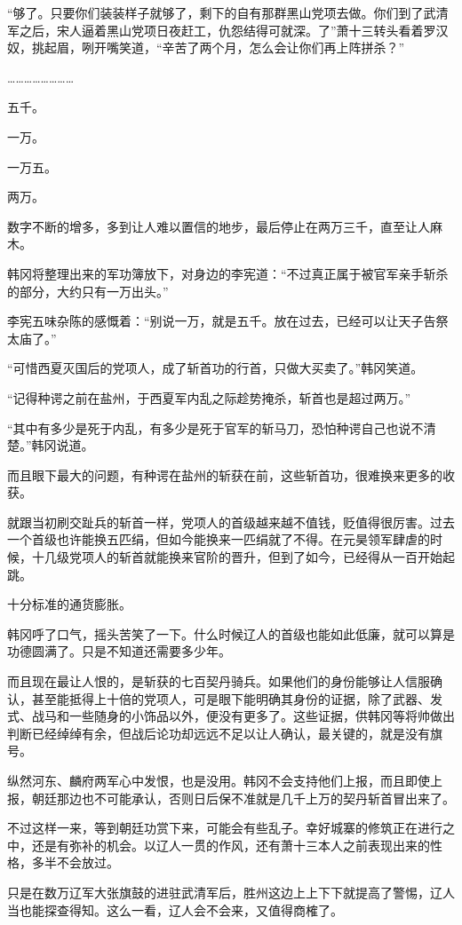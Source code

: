 “够了。只要你们装装样子就够了，剩下的自有那群黑山党项去做。你们到了武清军之后，宋人逼着黑山党项日夜赶工，仇怨结得可就深。了”萧十三转头看着罗汉奴，挑起眉，咧开嘴笑道，“辛苦了两个月，怎么会让你们再上阵拼杀？”

……………………

五千。

一万。

一万五。

两万。

数字不断的增多，多到让人难以置信的地步，最后停止在两万三千，直至让人麻木。

韩冈将整理出来的军功簿放下，对身边的李宪道：“不过真正属于被官军亲手斩杀的部分，大约只有一万出头。”

李宪五味杂陈的感慨着：“别说一万，就是五千。放在过去，已经可以让天子告祭太庙了。”

“可惜西夏灭国后的党项人，成了斩首功的行首，只做大买卖了。”韩冈笑道。

“记得种谔之前在盐州，于西夏军内乱之际趁势掩杀，斩首也是超过两万。”

“其中有多少是死于内乱，有多少是死于官军的斩马刀，恐怕种谔自己也说不清楚。”韩冈说道。

而且眼下最大的问题，有种谔在盐州的斩获在前，这些斩首功，很难换来更多的收获。

就跟当初刷交趾兵的斩首一样，党项人的首级越来越不值钱，贬值得很厉害。过去一个首级也许能换五匹绢，但如今能换来一匹绢就了不得。在元昊领军肆虐的时候，十几级党项人的斩首就能换来官阶的晋升，但到了如今，已经得从一百开始起跳。

十分标准的通货膨胀。

韩冈呼了口气，摇头苦笑了一下。什么时候辽人的首级也能如此低廉，就可以算是功德圆满了。只是不知道还需要多少年。

而且现在最让人恨的，是斩获的七百契丹骑兵。如果他们的身份能够让人信服确认，甚至能抵得上十倍的党项人，可是眼下能明确其身份的证据，除了武器、发式、战马和一些随身的小饰品以外，便没有更多了。这些证据，供韩冈等将帅做出判断已经绰绰有余，但战后论功却远远不足以让人确认，最关键的，就是没有旗号。

纵然河东、麟府两军心中发恨，也是没用。韩冈不会支持他们上报，而且即使上报，朝廷那边也不可能承认，否则日后保不准就是几千上万的契丹斩首冒出来了。

不过这样一来，等到朝廷功赏下来，可能会有些乱子。幸好城寨的修筑正在进行之中，还是有弥补的机会。以辽人一贯的作风，还有萧十三本人之前表现出来的性格，多半不会放过。

只是在数万辽军大张旗鼓的进驻武清军后，胜州这边上上下下就提高了警惕，辽人当也能探查得知。这么一看，辽人会不会来，又值得商榷了。

